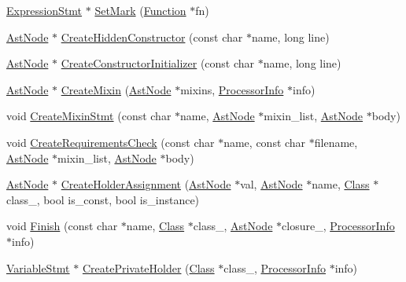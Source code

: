 \begin{DoxyCompactItemize}
\item 
\hyperlink{classmocha_1_1_expression_stmt}{ExpressionStmt} $\ast$ \hyperlink{classmocha_1_1_class_processor_utils_ab56c8f661100300b99a4ef01cca8ba11}{SetMark} (\hyperlink{classmocha_1_1_function}{Function} $\ast$fn)
\item 
\hyperlink{classmocha_1_1_ast_node}{AstNode} $\ast$ \hyperlink{classmocha_1_1_class_processor_utils_a9327665bf5bd23c50bf7925e4b497769}{CreateHiddenConstructor} (const char $\ast$name, long line)
\item 
\hyperlink{classmocha_1_1_ast_node}{AstNode} $\ast$ \hyperlink{classmocha_1_1_class_processor_utils_aa3d30f0d1db866791c961ba4193b4810}{CreateConstructorInitializer} (const char $\ast$name, long line)
\item 
\hyperlink{classmocha_1_1_ast_node}{AstNode} $\ast$ \hyperlink{classmocha_1_1_class_processor_utils_a29af6b8e270cc7ff00c9ed19ec06daaa}{CreateMixin} (\hyperlink{classmocha_1_1_ast_node}{AstNode} $\ast$mixins, \hyperlink{classmocha_1_1_processor_info}{ProcessorInfo} $\ast$info)
\item 
void \hyperlink{classmocha_1_1_class_processor_utils_a5a63e6c4b0567dfa908eeed3ac896ede}{CreateMixinStmt} (const char $\ast$name, \hyperlink{classmocha_1_1_ast_node}{AstNode} $\ast$mixin\_\-list, \hyperlink{classmocha_1_1_ast_node}{AstNode} $\ast$body)
\item 
void \hyperlink{classmocha_1_1_class_processor_utils_a66a15724e9fc5b217b958550c6911016}{CreateRequirementsCheck} (const char $\ast$name, const char $\ast$filename, \hyperlink{classmocha_1_1_ast_node}{AstNode} $\ast$mixin\_\-list, \hyperlink{classmocha_1_1_ast_node}{AstNode} $\ast$body)
\item 
\hyperlink{classmocha_1_1_ast_node}{AstNode} $\ast$ \hyperlink{classmocha_1_1_class_processor_utils_a66448399c2ac6f95d54efd5b2740ab3a}{CreateHolderAssignment} (\hyperlink{classmocha_1_1_ast_node}{AstNode} $\ast$val, \hyperlink{classmocha_1_1_ast_node}{AstNode} $\ast$name, \hyperlink{classmocha_1_1_class}{Class} $\ast$class\_\-, bool is\_\-const, bool is\_\-instance)
\item 
void \hyperlink{classmocha_1_1_class_processor_utils_ae749932a020a7f02b636caadc41ed885}{Finish} (const char $\ast$name, \hyperlink{classmocha_1_1_class}{Class} $\ast$class\_\-, \hyperlink{classmocha_1_1_ast_node}{AstNode} $\ast$closure\_\-, \hyperlink{classmocha_1_1_processor_info}{ProcessorInfo} $\ast$info)
\item 
\hyperlink{classmocha_1_1_variable_stmt}{VariableStmt} $\ast$ \hyperlink{classmocha_1_1_class_processor_utils_a1b999dea09f4b52d22ba43c71febd23e}{CreatePrivateHolder} (\hyperlink{classmocha_1_1_class}{Class} $\ast$class\_\-, \hyperlink{classmocha_1_1_processor_info}{ProcessorInfo} $\ast$info)

\end{DoxyCompactItemize}
